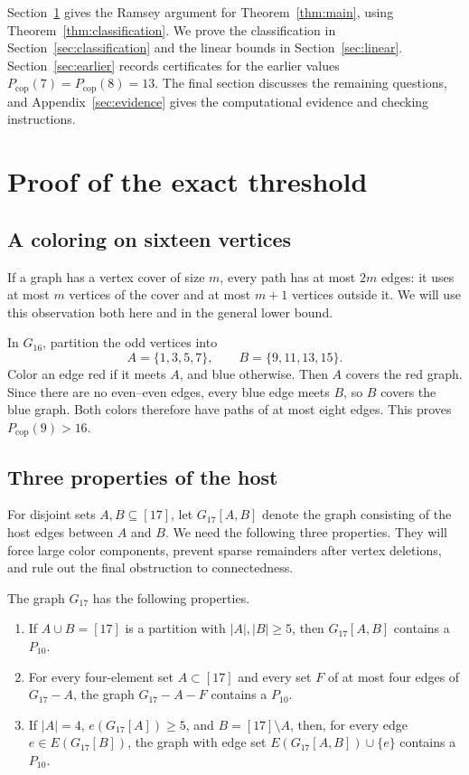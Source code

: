 \documentclass[12pt]{article}
\newcommand{\Pcop}{P_{\mathrm{cop}}}
\begin{document}
Section~\ref{sec:finite} gives the Ramsey argument for
Theorem~\ref{thm:main}, using Theorem~\ref{thm:classification}.
We prove the classification in Section~\ref{sec:classification}
and the linear bounds in Section~\ref{sec:linear}.
Section~\ref{sec:earlier} records certificates for the earlier
values $\Pcop(7)=\Pcop(8)=13$. The final section discusses
the remaining questions, and Appendix~\ref{sec:evidence}
gives the computational evidence and checking instructions.

\section{Proof of the exact threshold}\label{sec:finite}

\subsection{A coloring on sixteen vertices}

If a graph has a vertex cover of size $m$, every path has at most
$2m$ edges: it uses at most $m$ vertices of the cover and at most
$m+1$ vertices outside it. We will use this observation both here
and in the general lower bound.

In $G_{16}$, partition the odd vertices into
\[
 A=\{1,3,5,7\},\qquad B=\{9,11,13,15\}.
\]
Color an edge red if it meets $A$, and blue otherwise.
Then $A$ covers the red graph. Since there are no even--even
edges, every blue edge meets $B$, so $B$ covers the blue graph.
Both colors therefore have paths of at most eight edges.
This proves $\Pcop(9)>16$.

\subsection{Three properties of the host}

For disjoint sets $A,B\subseteq[17]$, let $G_{17}[A,B]$
denote the graph consisting of the host edges between $A$ and $B$.
We need the following three properties. They will force large
color components, prevent sparse remainders after vertex
deletions, and rule out the final obstruction to connectedness.

\begin{lemma}\label{lem:finite}
The graph $G_{17}$ has the following properties.
\begin{enumerate}
\item\label{item:cuts} If $A\cup B=[17]$ is a partition with
$|A|,|B|\geq5$, then $G_{17}[A,B]$ contains a $P_{10}$.
\item\label{item:faults} For every four-element set $A\subset[17]$
and every set $F$ of at most four edges of $G_{17}-A$, the graph
$G_{17}-A-F$ contains a $P_{10}$.
\item\label{item:extensions} If $|A|=4$, $e(G_{17}[A])\geq5$,
and $B=[17]\setminus A$, then, for every edge
$e\in E(G_{17}[B])$, the graph with edge set
$E(G_{17}[A,B])\cup\{e\}$ contains a $P_{10}$.
\end{enumerate}
\end{lemma}
\end{document}

